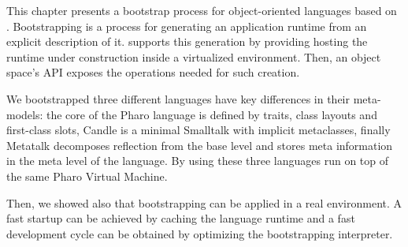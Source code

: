 This chapter presents a bootstrap process for object-oriented languages based on \Vtt. Bootstrapping is a process for generating an application runtime from an explicit description of it. \Vtt supports this generation by providing hosting the runtime under construction inside a virtualized environment. Then, an object space's API exposes the operations needed for such creation.


We bootstrapped three different languages have key differences in their meta-models: the core of the Pharo language is defined by traits, class layouts and first-class slots, Candle is a minimal Smalltalk with implicit metaclasses, finally Metatalk decomposes reflection from the base level and stores meta information in the meta level of the language. By using \Vtt these three languages run on top of the same Pharo Virtual Machine.

Then, we showed also that bootstrapping can be applied in a real environment. A fast startup can be achieved by caching the language runtime and a fast development cycle can be obtained by optimizing the bootstrapping interpreter.
